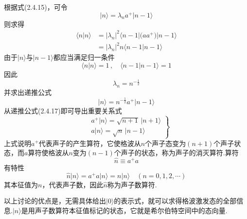 根据式(2.4.15)，可令
\begin{equation*}
  \lvert n\rangle=\lambda_na^{+}\lvert n-1\rangle
\end{equation*}
则求得
\begin{equation*}
\begin{aligned}
  \langle n\vert n\rangle&=|\lambda_n|^2\langle n-1\vert
  \bigl(aa^{+}\bigr)\vert n-1\rangle\\
  &=|\lambda_n|^2n\langle n-1\vert n-1\rangle
\end{aligned}
\end{equation*}
由于$\lvert n\rangle$与$\lvert n-1\rangle$都应当满足归一条件
\begin{equation*}
  \langle n\vert n\rangle=1\,,\quad\langle n-1\vert n-1\rangle=1
\end{equation*}
因此
\begin{equation*}
  \lambda_n=n^{-\frac{1}{2}}
\end{equation*}
并求出递推公式
\begin{equation}
  \lvert n\rangle=n^{-\frac{1}{2}}a^{+}\lvert n-1\rangle
\end{equation}
从递推公式(2.4.17)即可导出重要关系式
\begin{equation}
\left.\begin{aligned}
  &a^{+}\lvert n\rangle=\sqrt{n+1}\,\lvert n+1\rangle\\
  &a\lvert n\rangle=\sqrt{n}\,\lvert n-1\rangle
\end{aligned}\right\}
\end{equation}
上式说明$a^{+}$代表声子的产生算符，它使格波从$n$个声子态变为$(n+1)$个声子状态，而$a$算符使格波从$n$变为$(n-1)$个声子的状态，称为声子的消灭算符.算符
\begin{equation}
  \hat{n}\equiv a^{+}a
\end{equation}
有特性
\begin{equation}
  \hat{n}\lvert n\rangle=a^{+}a\lvert n\rangle=n\lvert n\rangle
  \quad(n=0,1,2,\cdots)
\end{equation}
其本征值为$n$，代表声子数，因此$\hat{n}$称为声子数算符.

以上讨论的优点是，无需具体给出$\lvert0\rangle$的表示式，就可以求得格波激发态的全部信息.$\lvert n\rangle$是用声子数算符本征值标记的状态，它就是希尔伯特空间中的态向量.

